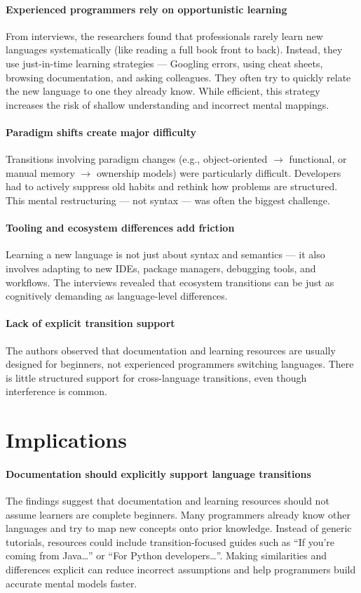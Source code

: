 \paragraph{Experienced programmers rely on opportunistic learning}
From interviews, the researchers found that professionals rarely learn new languages systematically (like reading a full book front to back). Instead, they use just-in-time learning strategies — Googling errors, using cheat sheets, browsing documentation, and asking colleagues. They often try to quickly relate the new language to one they already know. While efficient, this strategy increases the risk of shallow understanding and incorrect mental mappings.

\paragraph{Paradigm shifts create major difficulty}
Transitions involving paradigm changes (e.g., object-oriented $\rightarrow$ functional, or manual memory $\rightarrow$ ownership models) were particularly difficult. Developers had to actively suppress old habits and rethink how problems are structured. This mental restructuring — not syntax — was often the biggest challenge.

\paragraph{Tooling and ecosystem differences add friction}
Learning a new language is not just about syntax and semantics — it also involves adapting to new IDEs, package managers, debugging tools, and workflows. The interviews revealed that ecosystem transitions can be just as cognitively demanding as language-level differences.

\paragraph{Lack of explicit transition support}
The authors observed that documentation and learning resources are usually designed for beginners, not experienced programmers switching languages. There is little structured support for cross-language transitions, even though interference is common.

\section{Implications}
\paragraph{Documentation should explicitly support language transitions}
The findings suggest that documentation and learning resources should not assume learners are complete beginners. Many programmers already know other languages and try to map new concepts onto prior knowledge. Instead of generic tutorials, resources could include transition-focused guides such as “If you’re coming from Java…” or “For Python developers…”. Making similarities and differences explicit can reduce incorrect assumptions and help programmers build accurate mental models faster.

